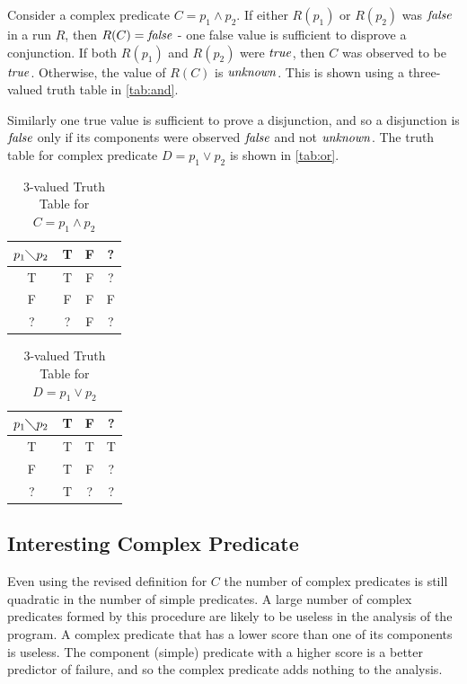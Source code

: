 Consider a complex predicate $C = p_1 \wedge p_2$.  If either $R(p_1)$ or $R(p_2)$ was $\mathit{false}$ in a run $R$, then $R(C) = \mathit{false}$ - one false value is sufficient to disprove a conjunction.  If both $R(p_1)$ and $R(p_2)$ were $\mathit{true}$, then $C$ was observed to be $\mathit{true}$.  Otherwise, the value of $R(C)$ is $\mathit{unknown}$. This is shown using a three-valued truth table in \autoref{tab:and}.

Similarly one true value is sufficient to prove a disjunction, and so a disjunction is $\mathit{false}$ only if its components were observed $\mathit{false}$ and not $\mathit{unknown}$.  The truth table for complex predicate $D = p_1 \vee p_2$ is shown in \autoref{tab:or}.

\begin{table}
  \caption{3-valued Truth Table for $C = p_1 \wedge p_2$}
  \label{tab:and}
  \centering
  \begin{tabular}{c|ccc}
    $p_1 \diagdown p_2$ & T & F & ? \\
    \hline
    T & T & F & ? \\
    F & F & F & F \\
    ? & ? & F & ? \\
  \end{tabular}
\end{table}


\begin{table}
  \caption{3-valued Truth Table for $D = p_1 \vee p_2$}
  \label{tab:or}
  \centering
  \begin{tabular}{c|ccc}
    $p_1 \diagdown p_2$ & T & F & ? \\
    \hline
    T & T & T & T \\
    F & T & F & ? \\
    ? & T & ? & ? \\
  \end{tabular}
\end{table}

\subsection{Interesting Complex Predicate}
Even using the revised definition for $C$ the number of complex predicates is still quadratic in the number of simple predicates.  A large number of complex predicates formed by this procedure are likely to be useless in the analysis of the program.  A complex predicate that has a lower score than one of its components is useless.  The component (simple) predicate with a higher score is a better predictor of failure, and so the complex predicate adds nothing to the analysis.

